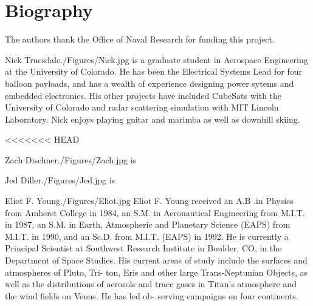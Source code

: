 \documentclass[twocolumn,letterpaper]{IEEEAerospace2012}
\newcommand{\rootdir}{./Figures/}
\begin{document}
\section{Biography}

\appendices

\acknowledgments
The authors thank the Office of Naval Research for funding this project.


\thebiography
\begin{biographywithjpg} 
{Nick Truesdale}{\rootdir Nick.jpg}
is a graduate student in Aerospace Engineering at the University of Colorado.
He has been the Electrical Systems Lead for four balloon payloads, and has a wealth of experience designing power sytems and embedded electronics. His other projects have included CubeSats with the University of Colorado and radar scattering simulation with MIT Lincoln Laboratory. Nick enjoys playing guitar and marimba as well as downhill skiing.   
\end{biographywithjpg}

<<<<<<< HEAD

\begin{biographywithjpg}{Zach Dischner}{\rootdir Zach.jpg}
is
\end{biographywithjpg}

\begin{biographywithjpg}{Jed Diller}{\rootdir Jed.jpg}
is
\end{biographywithjpg}

\begin{biographywithjpg}{Eliot F. Young}{\rootdir Eliot.jpg}
Eliot F. Young received an A.B .in
Physics from Amherst College in 1984,
an S.M. in Aeronautical Engineering
from M.I.T. in 1987, an S.M. in Earth,
Atmospheric and Planetary Science
(EAPS) from M.I.T. in 1990, and an
Sc.D. from M.I.T. (EAPS) in 1992. He is
currently a Principal Scientist at
Southwest Research Institute in Boulder,
CO, in the Department of Space Studies. His current areas
of study include the surfaces and atmospheres of Pluto, Tri-
ton, Eris and other large Trans-Neptunian Objects, as well
as the distributions of aerosols and trace gases in Titan's
atmosphere and the wind fields on Venus. He has led ob-
serving campaigns on four continents.
\end{biographywithjpg}
\end{document}
